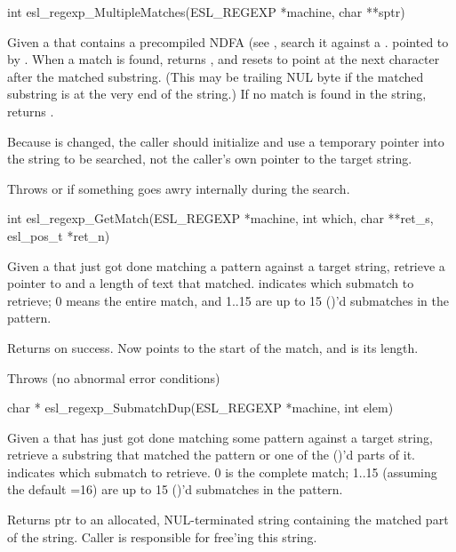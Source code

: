 \begin{sreapi}
\hypertarget{func:esl_regexp_MultipleMatches()}
{\item[int esl\_regexp\_MultipleMatches(ESL\_REGEXP *machine, char **sptr)]}

Given a  that contains a precompiled NDFA (see
, search it against a .
pointed to by . When a match is found, returns
, and resets  to point at the next character
after the matched substring. (This may be 
trailing NUL byte if the matched substring is at the
very end of the string.)  If no match is found in the
string, returns .

Because  is changed, the caller should
initialize and use a temporary pointer into the string
to be searched, not the caller's own pointer to the
target string.

Throws  or  if something goes awry internally
during the search.


\hypertarget{func:esl_regexp_GetMatch()}
{\item[int esl\_regexp\_GetMatch(ESL\_REGEXP *machine, int which, char **ret\_s, esl\_pos\_t *ret\_n)]}

Given a  that just got done matching a pattern
against a target string, retrieve a pointer to and a
length of text that matched.  indicates which
submatch to retrieve; 0 means the entire match, and
1..15 are up to 15 ()'d submatches in the pattern.

Returns  on success. Now  points to the start of
the match, and  is its length.

Throws (no abnormal error conditions)


\hypertarget{func:esl_regexp_SubmatchDup()}
{\item[char * esl\_regexp\_SubmatchDup(ESL\_REGEXP *machine, int elem)]}

Given a  that has just got done matching 
some pattern against a target string, 
retrieve a substring that matched the pattern
or one of the ()'d parts of it.  indicates
which submatch to retrieve.  0 is the complete
match;  1..15 (assuming the default =16)
are up to 15 ()'d submatches in the pattern.

Returns ptr to an allocated, NUL-terminated string containing
the matched part of the string. Caller is responsible
for free'ing this string.


\end{sreapi}
